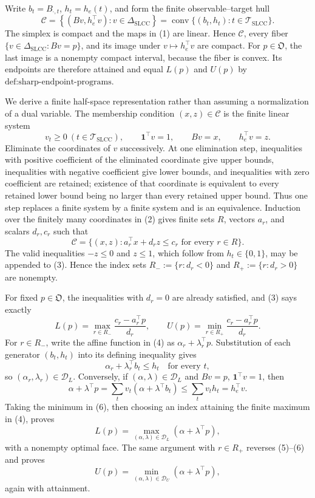 Write \(b_t=B_{\cdot,t}\), \(h_t=h_e(t)\), and form the finite observable--target hull
\[
\mathcal C=\left\{(Bv,h_e^{\top}v):v\in\Delta_{\mathrm{SLCC}}\right\}
=\operatorname{conv}\{(b_t,h_t):t\in\mathcal T_{\mathrm{SLCC}}\}.
\tag{1}
\]
The simplex is compact and the maps in (1) are linear.  Hence \(\mathcal C\), every fiber \(\{v\in\Delta_{\mathrm{SLCC}}:Bv=p\}\), and its image under \(v\mapsto h_e^{\top}v\) are compact.  For \(p\in\mathfrak O\), the last image is a nonempty compact interval, because the fiber is convex.  Its endpoints are therefore attained and equal \(L(p)\) and \(U(p)\) by \(\text{def:sharp-endpoint-programs}\).

We derive a finite half-space representation rather than assuming a normalization of a dual variable.  The membership condition \((x,z)\in\mathcal C\) is the finite linear system
\[
v_t\geq0\ (t\in\mathcal T_{\mathrm{SLCC}}),\qquad
\mathbf 1^{\top}v=1,\qquad Bv=x,\qquad h_e^{\top}v=z.
\tag{2}
\]
Eliminate the coordinates of \(v\) successively.  At one elimination step, inequalities with positive coefficient of the eliminated coordinate give upper bounds, inequalities with negative coefficient give lower bounds, and inequalities with zero coefficient are retained; existence of that coordinate is equivalent to every retained lower bound being no larger than every retained upper bound.  Thus one step replaces a finite system by a finite system and is an equivalence.  Induction over the finitely many coordinates in (2) gives finite sets \(R\), vectors \(a_r\), and scalars \(d_r,c_r\) such that
\[
\mathcal C=\{(x,z):a_r^{\top}x+d_rz\leq c_r\text{ for every }r\in R\}.
\tag{3}
\]
The valid inequalities \(-z\leq0\) and \(z\leq1\), which follow from \(h_t\in\{0,1\}\), may be appended to (3).  Hence the index sets \(R_-:=\{r:d_r<0\}\) and \(R_+:=\{r:d_r>0\}\) are nonempty.

For fixed \(p\in\mathfrak O\), the inequalities with \(d_r=0\) are already satisfied, and (3) says exactly
\[
L(p)=\max_{r\in R_-}\frac{c_r-a_r^{\top}p}{d_r},
\qquad
U(p)=\min_{r\in R_+}\frac{c_r-a_r^{\top}p}{d_r}.
\tag{4}
\]
For \(r\in R_-\), write the affine function in (4) as \(\alpha_r+\lambda_r^{\top}p\).  Substitution of each generator \((b_t,h_t)\) into its defining inequality gives
\[
\alpha_r+\lambda_r^{\top}b_t\leq h_t\quad\text{for every }t,
\tag{5}
\]
so \((\alpha_r,\lambda_r)\in\mathcal D_L\).  Conversely, if \((\alpha,\lambda)\in\mathcal D_L\) and \(Bv=p\), \(\mathbf 1^{\top}v=1\), then
\[
\alpha+\lambda^{\top}p
=\sum_t v_t(\alpha+\lambda^{\top}b_t)
\leq\sum_t v_th_t=h_e^{\top}v.
\tag{6}
\]
Taking the minimum in (6), then choosing an index attaining the finite maximum in (4), proves
\[
L(p)=\max_{(\alpha,\lambda)\in\mathcal D_L}
(\alpha+\lambda^{\top}p),
\tag{7}
\]
with a nonempty optimal face.  The same argument with \(r\in R_+\) reverses (5)--(6) and proves
\[
U(p)=\min_{(\alpha,\lambda)\in\mathcal D_U}
(\alpha+\lambda^{\top}p),
\tag{8}
\]
again with attainment.

